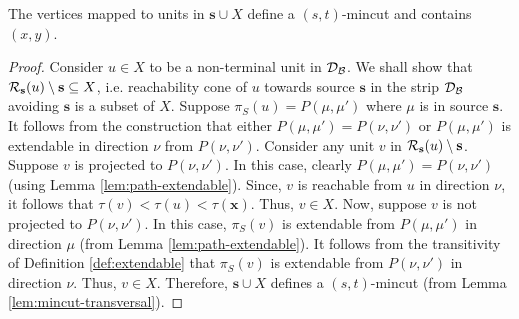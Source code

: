 \begin{lemma}
The vertices mapped to units in ${\mathbf s}\cup X$ define a $(s,t)$-mincut and contains $(x,y)$.
\end{lemma}
\begin{proof}
Consider $u \in X$ to be a non-terminal unit in ${\cal D}_{\cal B}$. We shall show that ${\cal R}_{\mathbf s}(u)\setminus \mathbf{s} \subseteq X$, i.e. reachability cone of $u$ towards source $\mathbf{s}$ in the strip ${\cal D}_{\cal B}$ avoiding $\mathbf s$ is a subset of $X$. Suppose $\pi_S(u)=P(\mu,\mu')$ where $\mu$ is in source $\mathbf{s}$. It follows from the construction that either $P(\mu,\mu') = P(\nu,\nu')$ or $P(\mu,\mu')$ is extendable in direction $\nu$ from $P(\nu,\nu')$. Consider any unit $v$ in ${\cal R}_{\mathbf s}(u)\setminus \mathbf{s}$.
Suppose $v$ is projected to $P(\nu,\nu')$. In this case, clearly $P(\mu,\mu') = P(\nu,\nu')$ (using Lemma \ref{lem:path-extendable}). Since, $v$ is reachable from $u$ in direction $\nu$, it follows that $\tau(v) < \tau(u) < \tau(\mathbf{x})$. Thus, $v \in X$. Now, suppose $v$ is not projected to $P(\nu,\nu')$. In this case, $\pi_S(v)$ is extendable from $P(\mu,\mu')$ in direction $\mu$ (from Lemma \ref{lem:path-extendable}). It follows from the transitivity of Definition \ref{def:extendable} that $\pi_S(v)$ is extendable from $P(\nu,\nu')$ in direction $\nu$. Thus, $v \in X$. Therefore, ${\mathbf s}\cup X$ defines a $(s,t)$-mincut (from Lemma \ref{lem:mincut-transversal}).

%
%
%
%


\end{proof}
